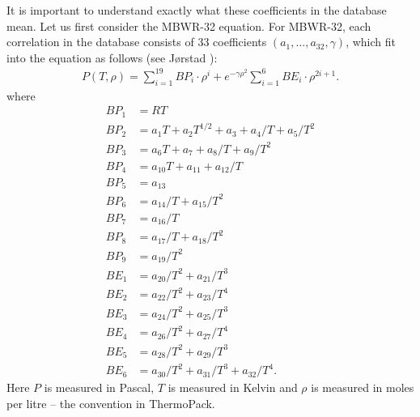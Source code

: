 \documentclass[internal,english]{sintefmemo2012}
\numberwithin{equation}{section}
\begin{document}
It is important to understand exactly what these coefficients in the
database mean. Let us first consider the MBWR-32 equation. For
MBWR-32, each correlation in the database consists of 33 coefficients
$(a_1,\ldots,a_{32},\gamma)$, which fit into the equation as follows (see
J{\o}rstad \cite{Jorstad93}):
\begin{align*}
  P(T,\rho) = \sum_{i=1}^{19} BP_i \cdot \rho^i + e^{-\gamma \rho^2}
  \sum_{i=1}^{6} BE_i \cdot \rho^{2i+1}.
\end{align*}
where
\begin{equation}
  \label{eq:BPBE_MBWR32}
  \begin{aligned}
    BP_1 &= RT \\
    BP_2 &= a_1T+a_2T^{1/2}+a_3+a_4/T+a_5/T^2 \\
    BP_3 &= a_6T+a_7+a_8/T+a_9/T^2 \\
    BP_4 &= a_{10}T+a_{11}+a_{12}/T \\
    BP_5 &= a_{13} \\
    BP_6 &= a_{14}/T+a_{15}/T^2 \\
    BP_7 &= a_{16}/T \\
    BP_8 &= a_{17}/T+a_{18}/T^2 \\
    BP_9 &= a_{19}/T^2 \\
    BE_1 &= a_{20}/T^2+a_{21}/T^3 \\
    BE_2 &= a_{22}/T^2+a_{23}/T^4 \\
    BE_3 &= a_{24}/T^2+a_{25}/T^3 \\
    BE_4 &= a_{26}/T^2+a_{27}/T^4 \\
    BE_5 &= a_{28}/T^2+a_{29}/T^3 \\
    BE_6 &= a_{30}/T^2+a_{31}/T^3 + a_{32}/T^4.
  \end{aligned}
\end{equation}
Here $P$ is measured in Pascal, $T$ is
measured in Kelvin and $\rho$ is measured in moles per litre -- the
convention in ThermoPack.
\end{document}
